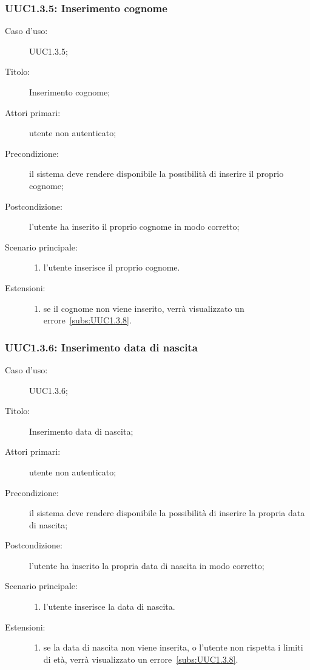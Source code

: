 \documentclass[../../../analisi-dei-requisiti.tex]{subfiles}
\begin{document}
\subsubsection{UUC1.3.5: Inserimento cognome}%
\label{subs:UUC1.3.5}
\begin{description}
  \item[Caso d'uso:] UUC1.3.5;
  \item[Titolo:] Inserimento cognome;
  \item[Attori primari:] utente non autenticato;
  \item[Precondizione:] il sistema deve rendere disponibile la possibilità di inserire il proprio cognome;
  \item[Postcondizione:] l'utente ha inserito il proprio cognome in modo corretto;
  \item[Scenario principale:]
        \begin{enumerate}
          \item l'utente inserisce il proprio cognome.
        \end{enumerate}
  \item[Estensioni:]
        \begin{enumerate}
          \item se il cognome non viene inserito, verrà visualizzato un errore~\ref{subs:UUC1.3.8}.
        \end{enumerate}
\end{description}

\subsubsection{UUC1.3.6: Inserimento data di nascita}%
\label{subs:UUC1.3.6}
\begin{description}
  \item[Caso d'uso:] UUC1.3.6;
  \item[Titolo:] Inserimento data di nascita;
  \item[Attori primari:] utente non autenticato;
  \item[Precondizione:] il sistema deve rendere disponibile la possibilità di inserire la propria data di nascita;
  \item[Postcondizione:] l'utente ha inserito la propria data di nascita in modo corretto;
  \item[Scenario principale:]
        \begin{enumerate}
          \item l'utente inserisce la data di nascita.
        \end{enumerate}
  \item[Estensioni:]
        \begin{enumerate}
          \item se la data di nascita non viene inserita, o l'utente non rispetta i limiti di età, verrà visualizzato un errore~\ref{subs:UUC1.3.8}.
        \end{enumerate}
\end{description}
\end{document}
